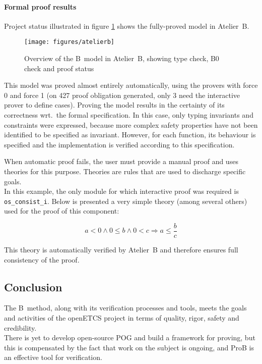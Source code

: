 \paragraph{Formal proof results}
\label{subapp:proof}

Project status illustrated in figure \ref{fig:atelierb} shows the fully-proved model in Atelier~B. 

\begin{figure}[h!]
\centering
\texttt{[image: figures/atelierb]}
\caption{Overview of the B~model in Atelier~B, showing type check, B0 check and proof status}
\label{fig:atelierb}
\end{figure}

This model was proved almost entirely automatically, using the provers with
force 0 and force 1 (on 427 proof obligation generated, only 3 need the
interactive prover to define cases). Proving the model results in the certainty
of its correctness wrt.\ the formal specification. In this case, only typing
invariants and constraints were expressed, because more complex safety
properties have not been identified to be specified as invariant. However, for each function, its behaviour is specified and the implementation is verified according to this specification.

When automatic proof fails, the user must provide a manual proof and uses theories for this purpose. Theories are rules that are used to discharge specific goals.\\
In this example, the only module for which interactive proof was required is \verb+os_consist_i+. Below is presented a very simple theory (among several others) used for the proof of this component:

\begin{equation}
\tag{User theory 1}
a < 0 \land 0 \leq b \land 0 < c \Rightarrow a \leq \frac{b}{c}
\end{equation}

This theory is automatically verified by Atelier~B and therefore ensures full consistency of the proof.


\subsection{Conclusion}
The B~method, along with its verification processes and tools, meets the goals and activities of the openETCS project in terms of quality, rigor, safety and credibility.\\
There is yet to develop open-source POG and build a framework for proving, but this is compensated by the fact that work on the subject is ongoing, and ProB is an effective tool for verification.

